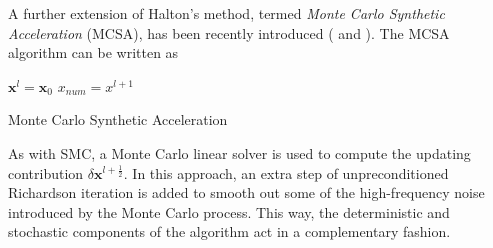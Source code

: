 A further extension of Halton's method, termed
\textit{Monte Carlo Synthetic Acceleration} (MCSA), has been recently
introduced (\cite{ESW2013} and \cite{EMSH2014}).  The MCSA algorithm can be written as
\begin{algorithm}[H]
 $\mathbf{x}^{l}=\mathbf{x}_0$\;
 $x_{num}=x^{l+1}$\;
 \caption{Monte Carlo Synthetic Acceleration}
\end{algorithm}
As with SMC, a Monte Carlo linear solver is used to compute the updating
contribution $\delta \mathbf{x}^{l+\frac{1}{2}}$.  In this approach, an
extra step of unpreconditioned Richardson iteration is added to smooth out
some of the high-frequency noise introduced by the Monte Carlo process.
This way, the deterministic and stochastic components of the algorithm
act in a complementary fashion.

